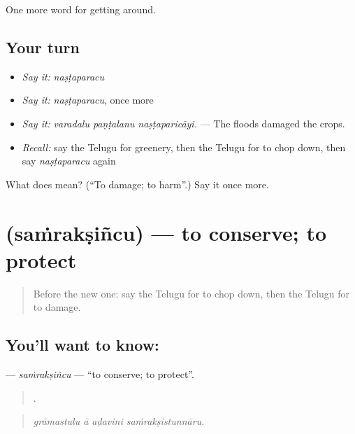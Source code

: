 \begin{grammarlens}[title={What you've built}]
One more word for getting around.
\end{grammarlens}

\subsection*{Your turn}
\begin{itemize}
\raggedright
  \item \emph{Say it:} \emph{naṣṭaparacu}
  \item \emph{Say it:} \emph{naṣṭaparacu}, once more
  \item \emph{Say it:} \emph{varadalu paṇṭalanu naṣṭaparicāyi.} — The floods damaged the crops.
  \item \emph{Recall:} say the Telugu for greenery, then the Telugu for to chop down, then say \emph{naṣṭaparacu} again
\end{itemize}

\begin{tcolorbox}[breakable,colback=teal!4,colframe=teal!35!black,title={Before you move on}]
What does  mean? (\textquotedblleft{}To damage; to harm\textquotedblright{}.) Say it once more.
\end{tcolorbox}
\section[\texorpdfstring{\te{సంరక్షించు} (saṁrakṣiñcu)}{సంరక్షించు (saṁrakṣiñcu)}]{ (saṁrakṣiñcu) — to conserve; to protect}

\label{lesson:TE-C471-samraksincu}



\begin{quote}
Before the new one: say the Telugu for to chop down, then the Telugu for to damage.
\end{quote}

\subsection*{You'll want to know: }
\textbf{} — \emph{saṁrakṣiñcu} — \textquotedblleft{}to conserve; to protect\textquotedblright{}.

\begin{quote}
   .
\end{quote}

\begin{quote}
\emph{grāmastulu ā aḍavini saṁrakṣistunnāru.}
\end{quote}


